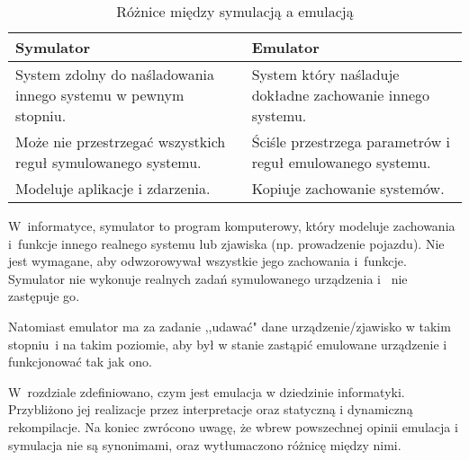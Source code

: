 	\begin{table}
		\centering
		\begin{tabular}{ m{7cm} | m{7cm} }
			Symulator &  Emulator  \\ 
			\hline
			System zdolny do naśladowania innego systemu w pewnym stopniu.  & System który naśladuje dokładne zachowanie innego systemu. \\   
			\hline
			Może nie przestrzegać wszystkich reguł symulowanego systemu. & Ściśle przestrzega parametrów i reguł emulowanego systemu. \\ 
			\hline
			Modeluje aplikacje i zdarzenia. & Kopiuje zachowanie systemów. \\ 
		\end{tabular}
		\caption{Różnice między symulacją a emulacją \cite{emulationOrSimulation}}
		\label{table:emulationAndSimulation}
	\end{table}
	
	W~informatyce, symulator to program komputerowy, który modeluje zachowania i~funkcje innego realnego systemu lub zjawiska (np. prowadzenie pojazdu). Nie jest wymagane, aby odwzorowywał wszystkie jego zachowania i~funkcje. Symulator nie wykonuje realnych zadań symulowanego urządzenia i ~nie zastępuje go\cite{emulationOrSimulation}.
	
	Natomiast emulator ma za zadanie ,,udawać" dane urządzenie/zjawisko w takim stopniu~i na takim poziomie, aby był w stanie zastąpić emulowane urządzenie i funkcjonować tak jak ono\cite{emulationOrSimulation2}.
	
	W~rozdziale zdefiniowano, czym jest emulacja w dziedzinie informatyki. Przybliżono jej realizacje przez interpretacje oraz statyczną i dynamiczną rekompilacje. Na koniec zwrócono uwagę, że wbrew powszechnej opinii emulacja i symulacja nie są synonimami, oraz wytłumaczono różnicę między nimi.

		

